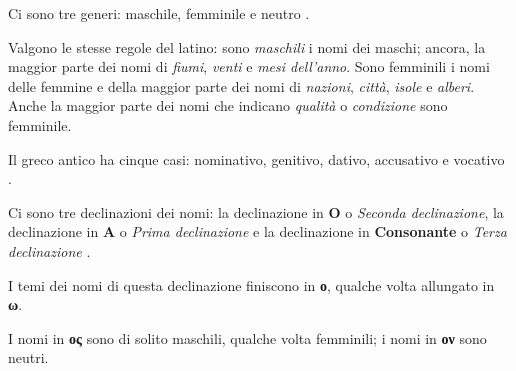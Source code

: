 \documentclass[nols]{tufte-handout}
\begin{document}
 Ci sono tre generi: maschile, femminile e neutro
.

 Valgono le stesse regole del latino: sono \textit{maschili} i nomi dei maschi; ancora, la maggior parte dei nomi di
\textit{fiumi}, \textit{venti} e \textit{mesi dell'anno}. Sono femminili i nomi delle femmine e della maggior parte dei nomi di 
\textit{nazioni}, \textit{città}, \textit{isole} e \textit{alberi}.
Anche la maggior parte dei nomi che indicano \textit{qualità} o \textit{condizione} sono femminile.  

 Il greco antico ha cinque casi: nominativo, genitivo, dativo, accusativo e vocativo
.
 
 Ci sono tre declinazioni dei nomi: la declinazione in \textbf{O} o \textit{Seconda declinazione}, 
la declinazione in \textbf{A} o \textit{Prima declinazione} 
e la declinazione in \textbf{Consonante} o \textit{Terza declinazione}
.

 I temi dei nomi di questa declinazione finiscono in \textbf{ο}, qualche volta allungato in \textbf{ω}.
 
 I nomi in \textbf{ος} sono di solito maschili, qualche volta femminili; i nomi in \textbf{ον} sono neutri.

\newpage

\end{document}

